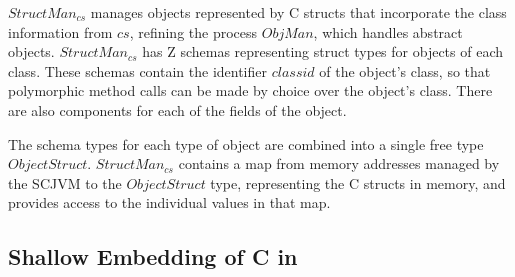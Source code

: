 $StructMan_{cs}$ manages objects represented by C structs that
incorporate the class information from $cs$, refining the process
$ObjMan$, which handles abstract objects.
$StructMan_{cs}$ has Z schemas representing struct types for objects
of each class.
%
%
These schemas contain the identifier $classid$ of the object's class, so
that polymorphic method calls can be made by choice over the object's
class. 
There are also components for each of the fields of the
object.

The schema types for each type of object are combined into a single
free type $ObjectStruct$.
$StructMan_{cs}$ contains a map from memory addresses managed by the
SCJVM to the $ObjectStruct$ type, representing the C structs in
memory, and provides access to the individual values in that map.

\subsection{Shallow Embedding of C in \Circus{}}
\label{cee-c-program-subsection}

